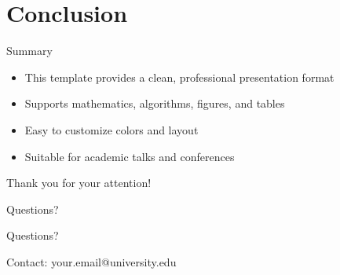 \documentclass[aspectratio=169, dvipsnames]{beamer}
\begin{document}

\section{Conclusion}

\begin{frame}{Summary}
    \begin{itemize}
        \item This template provides a clean, professional presentation format
        \item Supports mathematics, algorithms, figures, and tables
        \item Easy to customize colors and layout
        \item Suitable for academic talks and conferences
    \end{itemize}
    
    \vspace{2em}
    
    \begin{center}
        \Large Thank you for your attention!
    \end{center}
\end{frame}

\begin{frame}{Questions?}
    \begin{center}
        \Huge Questions?
        
        \vspace{2em}
        
        \large Contact: your.email@university.edu
    \end{center}
\end{frame}
\end{document}
